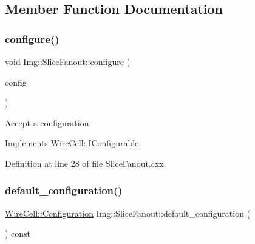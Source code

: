 \subsection{Member Function Documentation}
\mbox{\label{class_wire_cell_1_1_img_1_1_slice_fanout_a1a21cb99502e3c2cc219b37c0f1ec1e5}} 
\subsubsection{\texorpdfstring{configure()}{configure()}}
{\footnotesize\ttfamily void Img\+::\+Slice\+Fanout\+::configure (\begin{DoxyParamCaption}\item[{const \hyperlink{namespace_wire_cell_a9f705541fc1d46c608b3d32c182333ee}{Wire\+Cell\+::\+Configuration} \&}]{config }\end{DoxyParamCaption})\hspace{0.3cm}{\ttfamily [virtual]}}



Accept a configuration. 



Implements \hyperlink{class_wire_cell_1_1_i_configurable_a57ff687923a724093df3de59c6ff237d}{Wire\+Cell\+::\+I\+Configurable}.



Definition at line 28 of file Slice\+Fanout.\+cxx.

\mbox{\label{class_wire_cell_1_1_img_1_1_slice_fanout_aa76ff5e26f5ab807a7caecfc0939ff13}} 
\subsubsection{\texorpdfstring{default\+\_\+configuration()}{default\_configuration()}}
{\footnotesize\ttfamily \hyperlink{namespace_wire_cell_a9f705541fc1d46c608b3d32c182333ee}{Wire\+Cell\+::\+Configuration} Img\+::\+Slice\+Fanout\+::default\+\_\+configuration (\begin{DoxyParamCaption}{ }\end{DoxyParamCaption}) const\hspace{0.3cm}{\ttfamily [virtual]}}



